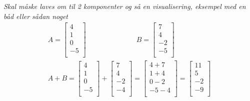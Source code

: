 \begin{eks}
\textit{Skal måske laves om til 2 komponenter og så en visualisering, eksempel med en båd eller sådan noget}
\begin{align*}
A=
\begin{bmatrix}
4\\
1\\
0\\
-5\\
\end{bmatrix}
\hspace{3cm}
B=
\begin{bmatrix}
7\\
4\\
-2\\
-5\\
\end{bmatrix}\\
A+B=
\begin{bmatrix}
4\\
1\\
0\\
-5\\
\end{bmatrix}
+
\begin{bmatrix}
7\\
4\\
-2\\
-4\\
\end{bmatrix}
=
\begin{bmatrix}
4+7\\
1+4\\
0-2\\
-5-4\\
\end{bmatrix}
=
\begin{bmatrix}
11\\
5\\
-2\\
-9\\
\end{bmatrix}
\end{align*}
\end{eks}

